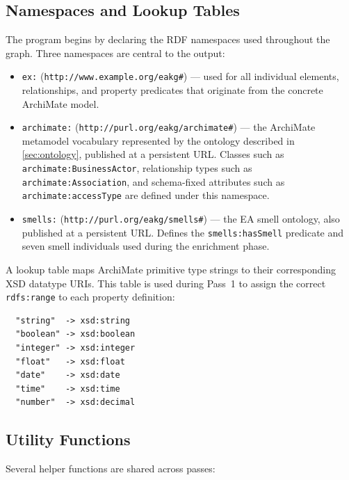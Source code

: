 \subsection{Namespaces and Lookup Tables}
\label{subsec:namespaces}

The program begins by declaring the RDF namespaces used throughout the graph. Three namespaces are central to the output:

\begin{itemize}
    \item \texttt{ex:} (\texttt{http://www.example.org/eakg\#}) --- used for all individual elements, relationships, and property predicates that originate from the concrete ArchiMate model.
    \item \texttt{archimate:} (\texttt{http://purl.org/eakg/archimate\#}) --- the ArchiMate metamodel vocabulary represented by the ontology described in \autoref{sec:ontology}, published at a persistent URL. Classes such as \texttt{archimate:BusinessActor}, relationship types such as \texttt{archimate:Association}, and schema-fixed attributes such as \texttt{archimate:accessType} are defined under this namespace.
    \item \texttt{smells:} (\texttt{http://purl.org/eakg/smells\#}) --- the EA smell ontology, also published at a persistent URL. Defines the \texttt{smells:hasSmell} predicate and seven smell individuals used during the enrichment phase.
\end{itemize}

A lookup table maps ArchiMate primitive type strings to their corresponding XSD datatype URIs. This table is used during Pass~1 to assign the correct \texttt{rdfs:range} to each property definition:

\begin{verbatim}
  "string"  -> xsd:string
  "boolean" -> xsd:boolean
  "integer" -> xsd:integer
  "float"   -> xsd:float
  "date"    -> xsd:date
  "time"    -> xsd:time
  "number"  -> xsd:decimal
\end{verbatim}

\subsection{Utility Functions}
\label{subsec:utilities}

Several helper functions are shared across passes:

